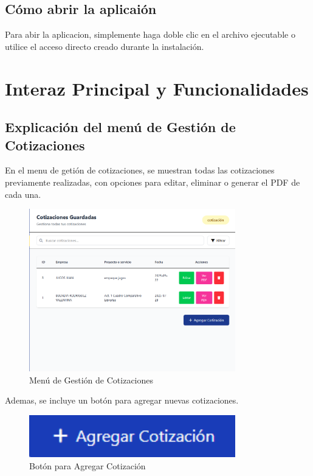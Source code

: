 \documentclass{Pretexto/bluereport}
\begin{document}
\subsection{Cómo abrir la aplicaión}

Para abir la aplicacion, simplemente haga doble clic en el archivo ejecutable o utilice el acceso directo creado durante la instalación.
\pagebreak
\section{Interaz Principal y Funcionalidades}
\subsection{Explicación del menú de Gestión de Cotizaciones}

En el menu de getión de cotizaciones, se muestran todas las cotizaciones previamente realizadas, con opciones para editar, eliminar o generar el PDF de cada una.

\begin{figure}[H]
    \centering
    \includegraphics[width=0.8\textwidth]{img/gestion_cotizaciones.png}
    \caption{Menú de Gestión de Cotizaciones}
    \label{fig:gestion_cotizaciones}
\end{figure}

Ademas, se incluye un botón para agregar nuevas cotizaciones.

\begin{figure}[H]
    \centering
    \includegraphics[width=0.8\textwidth]{img/agregar_cotizacion.png}
    \caption{Botón para Agregar Cotización}
    \label{fig:agregar_cotizacion}
\end{figure}
\end{document}

